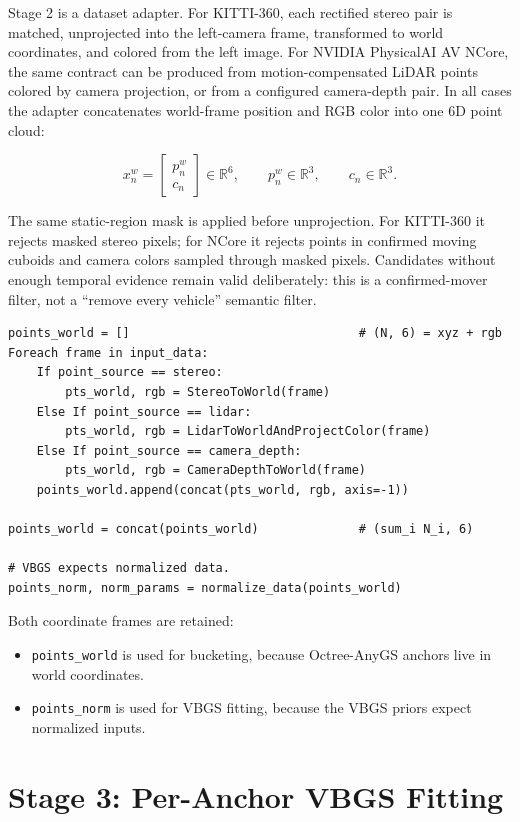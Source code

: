 \documentclass[11pt]{article}
\newcommand{\R}{\mathbb{R}}
\begin{document}
Stage 2 is a dataset adapter. For KITTI-360, each rectified stereo pair is
matched, unprojected into the left-camera frame, transformed to world
coordinates, and colored from the left image. For NVIDIA PhysicalAI AV NCore,
the same contract can be produced from motion-compensated LiDAR points colored
by camera projection, or from a configured camera-depth pair. In all cases the
adapter concatenates world-frame position and RGB color into one 6D point
cloud:

\[
  x_n^{w}
  =
  \begin{bmatrix}
    p_n^{w} \\
    c_n
  \end{bmatrix}
  \in \R^6,
  \qquad
  p_n^{w} \in \R^3,
  \qquad
  c_n \in \R^3.
\]

The same static-region mask is applied before unprojection. For KITTI-360 it
rejects masked stereo pixels; for NCore it rejects points in confirmed moving
cuboids and camera colors sampled through masked pixels. Candidates without
enough temporal evidence remain valid deliberately: this is a
confirmed-mover filter, not a ``remove every vehicle'' semantic filter.

\begin{lstlisting}
points_world = []                                # (N, 6) = xyz + rgb
Foreach frame in input_data:
    If point_source == stereo:
        pts_world, rgb = StereoToWorld(frame)
    Else If point_source == lidar:
        pts_world, rgb = LidarToWorldAndProjectColor(frame)
    Else If point_source == camera_depth:
        pts_world, rgb = CameraDepthToWorld(frame)
    points_world.append(concat(pts_world, rgb, axis=-1))

points_world = concat(points_world)              # (sum_i N_i, 6)

# VBGS expects normalized data.
points_norm, norm_params = normalize_data(points_world)
\end{lstlisting}

Both coordinate frames are retained:

\begin{itemize}
  \item \texttt{points\_world} is used for bucketing, because Octree-AnyGS
        anchors live in world coordinates.
  \item \texttt{points\_norm} is used for VBGS fitting, because the VBGS priors
        expect normalized inputs.
\end{itemize}

\section{Stage 3: Per-Anchor VBGS Fitting}
\end{document}
